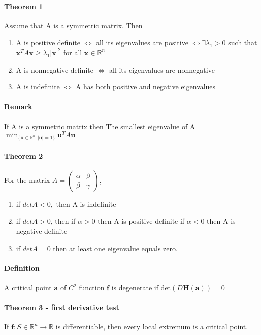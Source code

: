 \documentclass[11pt]{article}
\newcommand{\tb}[1]{\textbf{#1}}
\newcommand{\real}[0]{\mathbb{R}}
\newcommand{\under}[1]{\underline{#1}}
\begin{document}
\paragraph{Theorem 1} Assume that A is a symmetric matrix. Then \newline
\begin{enumerate}
    \item A is positive definite $\iff$ all its eigenvalues are positive \newline
$\iff \exists \lambda_1 > 0$ such that $\tb{x}^TA\tb{x} \geq \lambda_1|\tb{x}|^2$ for all $\tb{x} \in \real^n $
    \item A is nonnegative definite $\iff$ all its eigenvalues are nonnegative \newline
    \item A is indefinite $\iff$ A has both positive and negative eigenvalues
\end{enumerate}
\paragraph{Remark} If A is a symmetric matrix then \newline
The smallest eigenvalue of A = $\min_{\{\tb{u}\in \real^n: |\tb{u}| = 1\}} \tb{u}^TA\tb{u}$
\paragraph{Theorem 2} For the matrix $A = \begin{pmatrix}
    \alpha & \beta \\
    \beta & \gamma 
\end{pmatrix}$,
\begin{enumerate}
    \item if $det A < 0,$ then A is indefinite
    \item if $det A > 0$, then
    \subitem if $\alpha > 0$ then A is positive definite
    \subitem if $\alpha < 0$ then A is negative definite
    \item if $det A = 0$ then at least one eigenvalue equals zero.
\end{enumerate}
\paragraph{Definition} A critical point $\tb{a}$ of $C^2$ function $\tb{f}$ is \under{degenerate} if det$(D\tb{H}(\tb{a})) = 0$
\paragraph{Theorem 3 - first derivative test} If $\tb{f}: S \in \real^n \rightarrow \real$ is differentiable, then every local extremum is a critical point.
\end{document}
